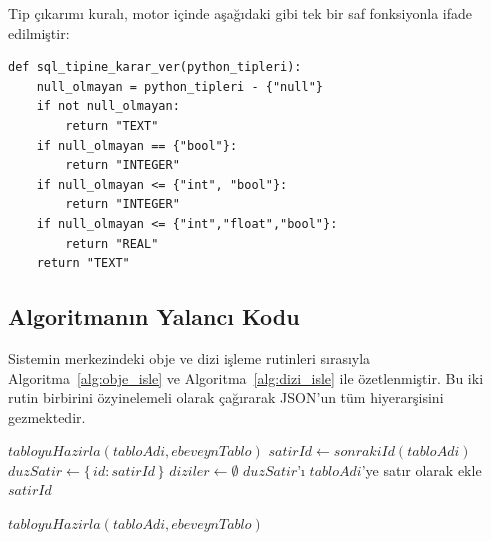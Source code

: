 \documentclass[conference,a4paper,10pt]{IEEEtran}
\begin{document}
Tip çıkarımı kuralı, motor içinde aşağıdaki gibi tek bir saf fonksiyonla ifade edilmiştir:

\begin{verbatim}
def sql_tipine_karar_ver(python_tipleri):
    null_olmayan = python_tipleri - {"null"}
    if not null_olmayan:
        return "TEXT"
    if null_olmayan == {"bool"}:
        return "INTEGER"
    if null_olmayan <= {"int", "bool"}:
        return "INTEGER"
    if null_olmayan <= {"int","float","bool"}:
        return "REAL"
    return "TEXT"
\end{verbatim}

\subsection{Algoritmanın Yalancı Kodu}

Sistemin merkezindeki obje ve dizi işleme rutinleri sırasıyla Algoritma~\ref{alg:obje_isle} ve Algoritma~\ref{alg:dizi_isle} ile özetlenmiştir. Bu iki rutin birbirini özyinelemeli olarak çağırarak JSON'un tüm hiyerarşisini gezmektedir.

\begin{algorithm}
\DontPrintSemicolon
\caption{Obje İşleme ve Şema Üretimi}
\label{alg:obje_isle}
\BlankLine
$tabloyuHazirla(tabloAdi, ebeveynTablo)$\;
$satirId \leftarrow sonrakiId(tabloAdi)$\;
$duzSatir \leftarrow \{\,id : satirId\,\}$\;
$diziler \leftarrow \emptyset$\;
$duzSatir$'ı $tabloAdi$'ye satır olarak ekle\;
\Return $satirId$\;
\end{algorithm}

\begin{algorithm}
\DontPrintSemicolon
\caption{Dizi İşleme ve Alt Tablo Üretimi}
\label{alg:dizi_isle}
\BlankLine
{}
$tabloyuHazirla(tabloAdi, ebeveynTablo)$\;
\end{algorithm}
\end{document}
